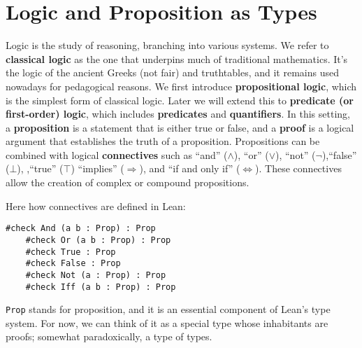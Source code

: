 
\section{Logic and Proposition as Types}

Logic is the study of reasoning, branching into various systems.
We refer to \textbf{classical logic} as the one that underpins much 
of traditional mathematics. 
It's the logic of the ancient Greeks (not fair) and truthtables, and it remains 
used nowadays for pedagogical reasons.
We first introduce \textbf{propositional logic}, which is the simplest 
form of classical logic. 
Later we will extend this to \textbf{predicate (or first-order) logic}, which includes 
\textbf{predicates} and \textbf{quantifiers}.
In this setting, a \textbf{proposition} is a statement that is either true or false, 
and a \textbf{proof} is a logical argument that establishes the truth of a 
proposition.
Propositions can be combined with logical \textbf{connectives} such as ``and'' ($\wedge$), 
``or'' ($\vee$), ``not'' ($\neg$),``false'' ($\bot$), ,``true'' ($\top$) ``implies'' ($\Rightarrow$),  and ``if and only if'' ($\Leftrightarrow$). 
These connectives allow the creation of complex or compound propositions.

Here how connectives are defined in Lean:\
\begin{example}\mbox{}
  \begin{lstlisting}[language=lean]
    #check And (a b : Prop) : Prop
    #check Or (a b : Prop) : Prop
    #check True : Prop
    #check False : Prop
    #check Not (a : Prop) : Prop
    #check Iff (a b : Prop) : Prop
  \end{lstlisting}
  \lstinline[language=lean]|Prop| stands for proposition, and it is an 
  essential component of Lean’s type system.
  For now, we can think of it as a special type whose 
  inhabitants are proofs; somewhat 
  paradoxically, a type of types. 
\end{example}



